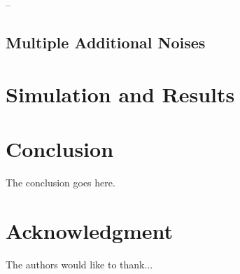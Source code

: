 \documentclass[conference]{IEEEtran}
\theoremstyle{definition}
\theoremstyle{definition}
\theoremstyle{remark}
\begin{document}
--






\subsection{Multiple Additional Noises}


% 
%                                 
%                                 
%                                 
% 

\section{Simulation and Results}




% 
%                                               
%                                               
%                                               
% 

\section{Conclusion}
The conclusion goes here.


\section*{Acknowledgment}
The authors would like to thank...




\end{document}

